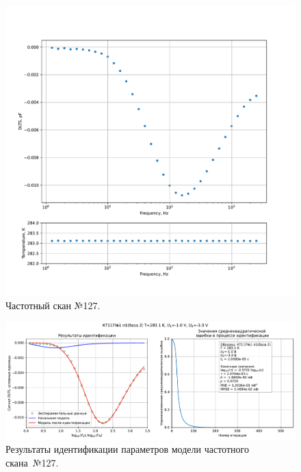 \begin{figure}[!ht]
    \centering
    \includegraphics[width=1\textwidth]{../plots/КТ117№1_п1(база 2)_2500Гц-1Гц_1пФ_+10С_-1В-3В_200мВ_20мкс_шаг_0,1.pdf}
    \caption{Частотный скан №127.}
    \label{pic:frequency_scan_127}
\end{figure}

\begin{figure}[!ht]
    \centering
    \includegraphics[width=1\textwidth]{../plots/КТ117№1_п1(база 2)_2500Гц-1Гц_1пФ_+10С_-1В-3В_200мВ_20мкс_шаг_0,1_model.pdf}
    \caption{Результаты идентификации параметров модели частотного скана~№127.}
    \label{pic:frequency_scan_model127}
\end{figure}

\pagebreak


